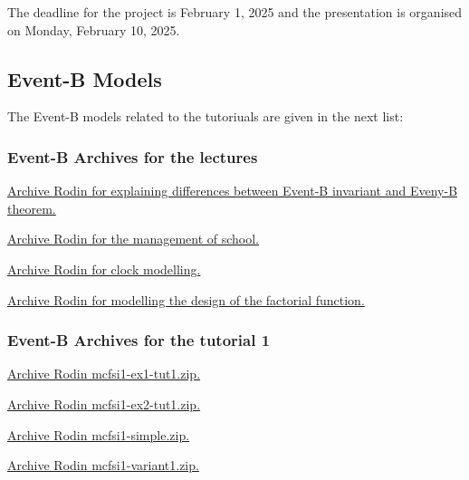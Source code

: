 \documentclass[ 12pt]{article}
\begin{document}
The deadline for the project is  February 1, 2025 and the presentation
is organised on Monday, February 10, 2025. 

  \subsection{Event-B Models}
\label{sec:event-b-models}


The Event-B models related to the tutoriuals are given in the next list: 

\subsubsection{Event-B Archives for the  lectures}

 \href{http://mery54.github.io/teaching/mosos/lecturesnotes/
   ex-safety.zip}{Archive Rodin  for  explaining differences between
   Event-B invariant and Eveny-B theorem. }


 
 \href{http://mery54.github.io/teaching/mosos/lecturesnotes/
   ex-school.zip}{Archive Rodin  for   the management of school. }

 
 
 \href{http://mery54.github.io/teaching/mosos/lecturesnotes/
   clock-tut0.zip}{Archive Rodin  for  clock modelling. }

  \href{http://mery54.github.io/teaching/mosos/lecturesnotes/factorial-plugin-tutO.zip}{Archive Rodin  for   modelling  the 
   design of the factorial function.}
  


 \subsubsection{Event-B Archives for   the tutorial 1}
\label{sec:event-b-archives}



\href{http://mery54.github.io/teaching/mosos/models/mcfsi1-ex1-tut1.zip}{Archive
  Rodin   mcfsi1-ex1-tut1.zip.}

\href{http://mery54.github.io/teaching/mosos/models/mcfsi1-ex1-tut1.zip}{Archive
  Rodin   mcfsi1-ex2-tut1.zip.}


\href{http://mery54.github.io/teaching/mosos/models/mcfsi1-simple.zip}{Archive 
  Rodin   mcfsi1-simple.zip.}

\href{http://mery54.github.io/teaching/mosos/models/mcfsi1-variant1.zip}{Archive 
  Rodin   mcfsi1-variant1.zip.}
\end{document}
